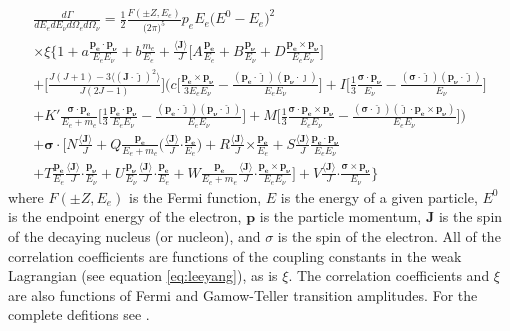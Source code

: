 \begin{multline}
  \frac{d\Gamma}{dE_e dE_\nu d\Omega_e d\Omega_\nu} = \frac{1}{2} \frac{F(\pm Z, E_e)}{\big( 2\pi \big)^5}
  p_e E_e \big( E^0 - E_e \big)^2 \\ \times \xi 
  \Bigg\{ 1 + a\frac{\boldsymbol{p_e \cdot p_\nu}}{E_e E_\nu} + b\frac{m_e}{E_e} 
  + \frac{\boldsymbol{\langle J \rangle}}{J} \Bigg[ A\frac{\boldsymbol{p_e}}{E_e}
    + B\frac{\boldsymbol{p_\nu}}{E_\nu} + D\frac{\boldsymbol{p_e \times p_\nu}}{E_e E_\nu}\Bigg] \\
  + \Bigg[ \frac{J(J+1)-3\langle (\boldsymbol{J \cdot \hat{\jmath}})^2 \rangle}{J(2J-1)} \Bigg]
  \Bigg( c\Bigg[ \frac{\boldsymbol{p_e} \times \boldsymbol{p_\nu}}{3E_eE_\nu} -
    \frac{(\boldsymbol{p_e\cdot \hat{\jmath}})(\boldsymbol{p_\nu\cdot \hat{\jmath}}) }{E_eE_\nu} \Bigg]
  + I \Bigg[ \frac{1}{3}\frac{\boldsymbol{\sigma \cdot p_\nu}}{E_\nu}
    - \frac{(\boldsymbol{\sigma \cdot \hat{\jmath}})(\boldsymbol{p_\nu \cdot \hat{\jmath}})}{E_\nu} \Bigg] \\
  + K'\frac{\boldsymbol{\sigma \cdot p_e}}{E_e+m_e} \Bigg[ \frac{1}{3}\frac{\boldsymbol{p_e \cdot p_\nu}}{E_e E_\nu}
    - \frac{(\boldsymbol{p_e \cdot \hat{\jmath}})(\boldsymbol{p_\nu \cdot \hat{\jmath}})}{E_e E_\nu} \Bigg] 
  + M \Bigg[ \frac{1}{3}\frac{\boldsymbol{\sigma \cdot p_e \times p_\nu}}{E_e E_\nu}
    - \frac{(\boldsymbol{\sigma \cdot \hat{\jmath}})(\boldsymbol{\hat{\jmath} \cdot p_e \times p_\nu })}{E_e E_\nu} \Bigg] \Bigg) \\
  + \boldsymbol{\sigma} \cdot \Bigg[ N\frac{\langle \boldsymbol{J} \rangle}{J}
    + Q\frac{\boldsymbol{p_e}}{E_e+m_e}\Bigg(\frac{\langle \boldsymbol{J} \rangle}{J}\boldsymbol{\cdot} \frac{\boldsymbol{p_e}}{E_e}\Bigg)
    + R\frac{\langle \boldsymbol{J} \rangle}{J}\boldsymbol{\times} \frac{\boldsymbol{p_e}}{E_e}
    + S\frac{\langle \boldsymbol{J} \rangle}{J} \frac{\boldsymbol{p_e\cdot p_\nu}}{E_e E_\nu} \\
    + T\frac{\boldsymbol{p_e}}{E_e}\frac{\langle \boldsymbol{J} \rangle}{J} \boldsymbol{\cdot} \frac{\boldsymbol{p_\nu}}{E_\nu}
    + U\frac{\boldsymbol{p_\nu}}{E_\nu}\frac{\langle \boldsymbol{J} \rangle}{J} \boldsymbol{\cdot} \frac{\boldsymbol{p_e}}{E_e}
    + W\frac{\boldsymbol{p_e}}{E_e+m_e}\frac{\langle \boldsymbol{J} \rangle}{J} \boldsymbol{\cdot} \frac{\boldsymbol{p_e \times p_\nu}}{E_e E_\nu}
    \Bigg]
  + V\frac{\langle \boldsymbol{J} \rangle}{J} \boldsymbol{\cdot} \frac{\boldsymbol{\sigma \times p_\nu}}{E_\nu}
  \Bigg\}
  \label{eq:jackson}
\end{multline}
%
where $F(\pm Z, E_e)$ is the Fermi function, $E$ is the energy of a given particle, $E^0$ is the endpoint
energy of the electron, $\boldsymbol{p}$ is the particle momentum, $\boldsymbol{J}$ is the spin of the
decaying nucleus (or nucleon), and $\sigma$ is the spin of the electron. All of the correlation coefficients
are functions of the coupling constants in the weak Lagrangian (see equation \ref{eq:leeyang}),
as is $\xi$. The correlation coefficients and $\xi$ are also functions of Fermi and Gamow-Teller
transition amplitudes. For the complete defitions see
\cite{jackson1957a,jackson1957b,ebel1957}.

